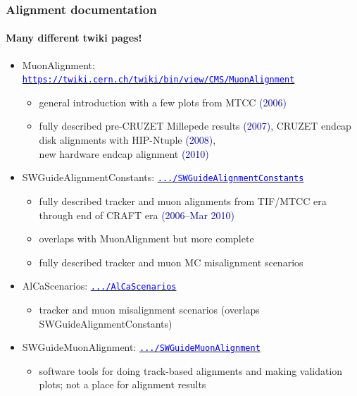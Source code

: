 \documentclass[compress]{beamer}
\begin{document}
\begin{frame}
\frametitle{Alignment documentation}
\framesubtitle{Many different twiki pages!}

\begin{itemize}
\item MuonAlignment: \href{https://twiki.cern.ch/twiki/bin/view/CMS/MuonAlignment}{\tt \tiny \textcolor{blue}{https://twiki.cern.ch/twiki/bin/view/CMS/MuonAlignment}}
\begin{itemize}
\item general introduction with a few plots from MTCC \textcolor{darkblue}{(2006)}
\item fully described pre-CRUZET Millepede results \textcolor{darkblue}{(2007)}, CRUZET endcap disk alignments with HIP-Ntuple \textcolor{darkblue}{(2008)}, \\ new hardware endcap alignment \textcolor{darkblue}{(2010)}
\end{itemize}

\item SWGuideAlignmentConstants: \href{https://twiki.cern.ch/twiki/bin/view/CMS/SWGuideAlignmentConstants}{\tt \tiny \textcolor{blue}{.../SWGuideAlignmentConstants}}
\begin{itemize}
\item fully described tracker and muon alignments from TIF/MTCC era through end of CRAFT era \textcolor{darkblue}{(2006--Mar 2010)}
\item overlaps with MuonAlignment but more complete
\item fully described tracker and muon MC misalignment scenarios
\end{itemize}

\item AlCaScenarios: \href{https://twiki.cern.ch/twiki/bin/view/CMS/AlCaScenarios}{\tt \tiny \textcolor{blue}{.../AlCaScenarios}}
\begin{itemize}
\item tracker and muon misalignment scenarios (overlaps SWGuideAlignmentConstants)
\end{itemize}

\item SWGuideMuonAlignment: \href{https://twiki.cern.ch/twiki/bin/view/CMS/SWGuideMuonAlignment}{\tt \tiny \textcolor{blue}{.../SWGuideMuonAlignment}}
\begin{itemize}
\item software tools for doing track-based alignments and making validation plots; not a place for alignment results
\end{itemize}

\end{itemize}
\end{frame}
\end{document}
